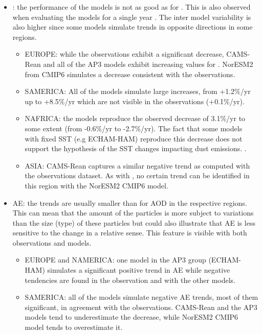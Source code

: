 \documentclass[acp, manuscript]{copernicus}
\begin{document}
\begin{itemize}
\begin{itemize}
       \end{itemize}
 \item {}: the performance of the models is not as good as for . This is also observed when evaluating the models for a single year \citep{jonaseval}. The inter model variability is also higher since some models simulate  trends in opposite directions in some regions.
       \begin{itemize}
        \item EUROPE: while the observations exhibit a significant decrease, CAMS-Rean and all of the AP3 models exhibit increasing values for . NorESM2 from CMIP6 simulates a decrease consistent with the observations.
        \item SAMERICA: All of the models simulate large increases, from +1.2\%/yr up to +8.5\%/yr  which are not visible in the observations (+0.1\%/yr).
        \item NAFRICA: the models reproduce the observed decrease of 3.1\%/yr to some extent (from -0.6\%/yr to -2.7\%/yr). The fact that some models with fixed SST (e.g ECHAM-HAM) reproduce this decrease does not support the hypothesis of the SST changes impacting dust emissions. \citep{fan2004impact,bauer2005impact,bauer2007sulfate,neubauer2019global}.
        \item ASIA: CAMS-Rean captures a similar negative trend as computed with the observations dataset. As with , no certain trend can be identified  in this region with the NorESM2 CMIP6 model.
       \end{itemize}
 \item AE: the trends are usually smaller than for AOD in the respective regions. This can mean that the amount of the particles is more subject to variations than the size (type) of these particles but could also illustrate that AE is less sensitive to the change in a relative sense. This feature is visible with both observations and models.
       \begin{itemize}
        \item EUROPE and NAMERICA: one model in the AP3 group (ECHAM-HAM) simulates a significant positive trend in AE while negative tendencies are found in the observation and with the other models.
        \item SAMERICA: all of the models simulate negative AE trends, most of them significant, in agreement with the observations. CAMS-Rean and the AP3 models tend to underestimate the decrease, while NorESM2 CMIP6 model tends to overestimate it.

\end{itemize}
\end{itemize}
\end{document}
